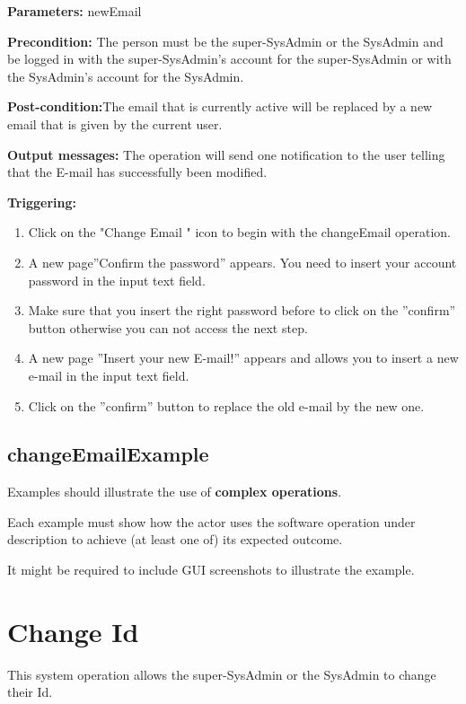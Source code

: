 \begin{description}

\item \textbf{Parameters:} newEmail
\item \textbf{Precondition:} The person must be the super-SysAdmin or the
SysAdmin and be logged in with the super-SysAdmin's account for the
super-SysAdmin or with the SysAdmin's account for the SysAdmin.
\item \textbf{Post-condition:}The email that is currently active will be
replaced by a new email that is given by the current user.
\item \textbf{Output messages:} The operation will send one notification to the
user telling that the E-mail has successfully been modified.


\item \textbf{Triggering:}
\begin{enumerate}
\item Click on the "Change Email " icon to begin with the changeEmail operation. 
\item A new page''Confirm the password'' appears. You need to insert your
account password in the input text field. 
\item Make sure that you insert the right password before to click on the
''confirm'' button otherwise you can not access the next step.
\item A new page ''Insert your new E-mail!'' appears and allows you to
insert a new e-mail in the input text field.
\item Click on the ''confirm'' button to replace the old e-mail by the new one.

\end{enumerate}

 
\end{description}

 
\subsection{changeEmailExample}
Examples should illustrate the use of \textbf{complex operations}.

Each example must show how the actor uses the software operation under
description to achieve (at least one of) its expected outcome.

It might be required to include GUI screenshots to illustrate the example.




\section{Change Id}
\label{operation:changeId}
This system operation allows the super-SysAdmin or the SysAdmin to change
their Id.

